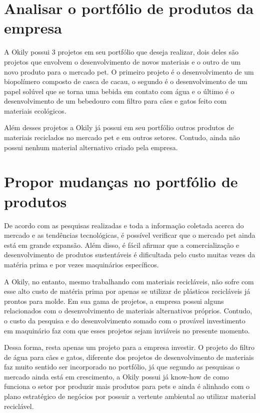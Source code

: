 \documentclass[
	12pt,				%
	openright,			%
	oneside,			%
	a4paper,			%
	english,			%
	french,				%
	spanish,			%
	brazil				%
	]{abntex2}
\begin{document}
\section{Analisar o portfólio de produtos da empresa}

A Okily possui 3 projetos em seu portfólio que deseja realizar, dois deles são
projetos que envolvem o desenvolvimento de novos materiais e o outro de um novo produto
para o mercado pet. O primeiro projeto é o desenvolvimento de um biopolímero composto
de casca de cacau, o segundo é o desenvolvimento de um papel solúvel que se torna uma
bebida em contato com água e o último é o desenvolvimento de um bebedouro com filtro
para cães e gatos feito com materiais ecológicos.

Além desses projetos a Okily já possui em seu portfólio outros produtos de materiais reciclados no mercado pet e em outros setores. Contudo, ainda não possui nenhum material alternativo criado pela empresa. 

\section{Propor mudanças no portfólio de produtos}

De acordo com as pesquisas realizadas e toda a informação coletada acerca do mercado e as tendências tecnológicas, é possível verificar que o mercado pet ainda está em grande expansão. Além disso, é fácil afirmar que a comercialização e desenvolvimento de produtos sustentáveis é dificultada pelo custo muitas vezes da matéria prima e por vezes maquinários específicos.

A Okily, no entanto, mesmo trabalhando com materiais recicláveis, não sofre com esse alto custo de matéria prima por apenas se utilizar de plásticos recicláveis já prontos para molde. Em sua gama de projetos, a empresa possui alguns relacionados com o desenvolvimento de materiais alternativos próprios. Contudo, o custo da pesquisa e do desenvolvimento somado com o provável investimento em maquinário faz com que esses projetos sejam inviáveis no presente momento.

Dessa forma, resta apenas um projeto para a empresa investir. O projeto do filtro de água para cães e gatos, diferente dos projetos de desenvolvimento de materiais faz muito sentido ser incorporado no portfólio, já que segundo as pesquisas o mercado ainda está em crescimento, a Okily possui já know-how de como funciona o setor por produzir mais produtos para pets e ainda é alinhado com o plano estratégico de negócios por possuir a vertente ambiental ao utilizar material reciclável.
\end{document}
